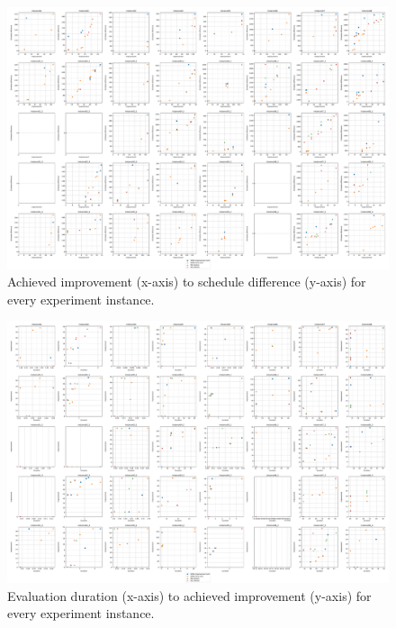 \begin{figure}
    \centering
    \includegraphics[angle=270,width=\textwidth]{img/exp_improv_diff.pdf}
    \caption{
        Achieved improvement (x-axis) to schedule
        difference (y-axis) for every experiment instance.
        }
    \label{fig:exp-full/improv-diff}
\end{figure}

\begin{figure}
    \centering
    \includegraphics[angle=270,width=\textwidth]{img/exp_duration_improv.pdf}
    \caption{
        Evaluation duration (x-axis) to achieved
        improvement (y-axis) for every experiment instance.
        }
    \label{fig:exp-full/duration-improv}
\end{figure}


